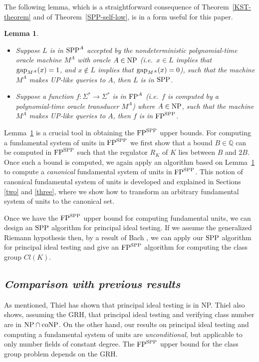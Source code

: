 \documentclass{article}
\newcommand{\FP}{{\rm FP}}
\newcommand{\gap}{{\rm gap}}
\newcommand{\NP}{{\rm NP}}
\newcommand{\coNP}{\mbox{{\rm coNP}}}
\newcommand{\SPP}{{\rm SPP}}
\newtheorem{lemma}[theorem]{Lemma}
\theoremstyle{definition}\newtheorem{remark}[theorem]{Remark}
\begin{document}
The following lemma, which is a straightforward consequence of
Theorem~\ref{KST-theorem} and of Theorem~\ref{SPP-self-low}, is in a
form useful for this paper.

\begin{lemma}\label{KST-cor}\mbox{}
\begin{itemize}
\item Suppose $L$ is in $\SPP^A$ accepted by the nondeterministic
  polynomial-time oracle machine $M^A$ with oracle $A\in\NP$ (i.e.\ 
  $x\in L$ implies that $\gap_{M^A}(x)=1$, and $x\not\in L$ implies
  that $\gap_{M^A}(x)=0$), such that the machine $M^A$ makes UP-like
  queries to $A$, then $L$ is in $\SPP$.
\item Suppose a function $f:\Sigma^*\rightarrow\Sigma^*$ is in $\FP^A$
  (i.e.\ $f$ is computed by a polynomial-time oracle transducer $M^A$)
  where $A\in\NP$, such that the machine $M^A$ makes UP-like queries
  to $A$, then $f$ is in $\FP^{\SPP}$.
\end{itemize}
\end{lemma}

Lemma~\ref{KST-cor} is a crucial tool in obtaining the $\FP^{\SPP}$
upper bounds. For computing a fundamental system of units in
$\FP^{\SPP}$ we first show that a bound $B\in\mathbb{Q}$ can be
computed in $\FP^{\SPP}$ such that the regulator $R_K$ of $K$ lies
between $B$ and $2B$. Once such a bound is computed, we again apply an
algorithm based on Lemma~\ref{KST-cor} to compute a \emph{canonical}
fundamental system of units in $\FP^{\SPP}$.  This notion of canonical
fundamental system of units is developed and explained in Sections
\ref{two} and \ref{three}, where we show how to transform an arbitrary
fundamental system of units to the canonical set.

Once we have the $\FP^{\SPP}$ upper bound for computing fundamental
units, we can design an $\SPP$ algorithm for principal ideal
testing. If we assume the generalized Riemann hypothesis then, by a
result of Bach \cite{bach90grh}, we can apply our $\SPP$ algorithm for
principal ideal testing and give an $\FP^\SPP$ algorithm for computing
the class group $Cl(K)$.

\subsection{\it Comparison with previous results}

As mentioned, Thiel \cite{thiel94class} has shown that principal ideal
testing is in NP. Thiel also shows, assuming the GRH, that principal
ideal testing and verifying class number are in $\NP\cap\coNP$. On the
other hand, our results on principal ideal testing and computing a
fundamental system of units are \emph{unconditional}, but applicable
to only number fields of constant degree. The $\FP^{\SPP}$ upper bound
for the class group problem depends on the GRH.
\end{document}
